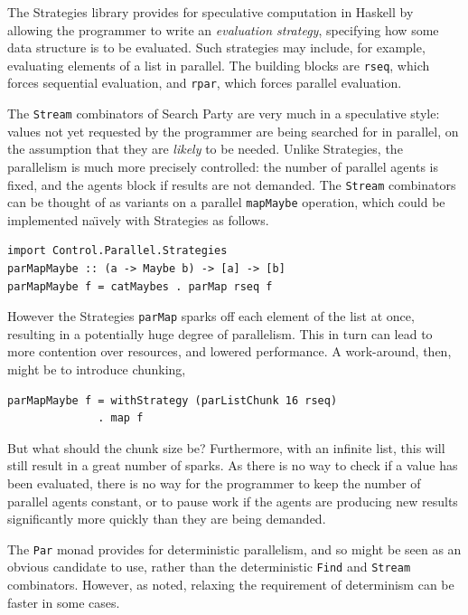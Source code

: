 The Strategies\cite{strategies} library provides for speculative
computation in Haskell by allowing the programmer to write an
\textit{evaluation strategy}, specifying how some data structure is to
be evaluated. Such strategies may include, for example, evaluating
elements of a list in parallel. The building blocks are \verb|rseq|,
which forces sequential evaluation, and \verb|rpar|, which forces
parallel evaluation.

The \verb|Stream| combinators of Search Party are very much in a
speculative style: values not yet requested by the programmer are
being searched for in parallel, on the assumption that they are
\textit{likely} to be needed. Unlike Strategies, the parallelism is
much more precisely controlled: the number of parallel agents is
fixed, and the agents block if results are not demanded. The
\verb|Stream| combinators can be thought of as variants on a parallel
\verb|mapMaybe| operation, which could be implemented na\"{\i}vely
with Strategies as follows.

\begin{verbatim}
import Control.Parallel.Strategies
parMapMaybe :: (a -> Maybe b) -> [a] -> [b]
parMapMaybe f = catMaybes . parMap rseq f
\end{verbatim}

However the Strategies \verb|parMap| sparks off each element of the
list at once, resulting in a potentially huge degree of
parallelism. This in turn can lead to more contention over resources,
and lowered performance. A work-around, then, might be to introduce
chunking,

\begin{verbatim}
parMapMaybe f = withStrategy (parListChunk 16 rseq)
              . map f
\end{verbatim}

But what should the chunk size be? Furthermore, with an infinite list,
this will still result in a great number of sparks. As there is no way
to check if a value has been evaluated, there is no way for the
programmer to keep the number of parallel agents constant, or to pause
work if the agents are producing new results significantly more
quickly than they are being demanded.

The \verb|Par| monad\cite{par} provides for deterministic parallelism,
and so might be seen as an obvious candidate to use, rather than the
deterministic \verb|Find| and \verb|Stream| combinators. However, as
noted, relaxing the requirement of determinism can be faster in some
cases.

